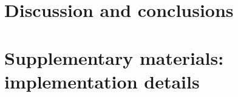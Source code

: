 \documentclass{article}
\DeclareMathOperator*{\argmin}{arg\,min}
\DeclareMathOperator*{\sign}{sign}
\newcommand{\ZZ}{\mathbb Z}
\newcommand{\RR}{\mathbb R}
\begin{document}
\section{Discussion and conclusions}







\section{Supplementary materials: implementation details}
\label{sec:peakseg_details}



\end{document}
